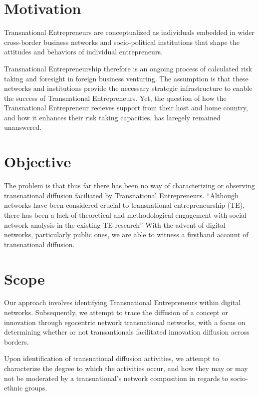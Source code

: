 \section{Motivation}
Transnational Entrepreneurs are conceptualized as individuals embedded
in wider cross-border business networks and socio-political
institutions that shape the attitudes and behaviors of individual
entrepreneurs.

Transnational Entrepreneurship therefore is an ongoing process of
calculated risk taking and foresight in foreign business
venturing. The assumption is that these networks and institutions
provide the necessary strategic infrastructure to enable the success
of Transnational Entrepreneurs. Yet, the question of how the
Transnational Entrepreneur recieves support from their host and home
country, and how it enhances their risk taking capacities, has
laregely remained unanswered.

\section{Objective}
The problem is that thus far there has been no way of characterizing
or observing transnational diffusion faciliated by Transnational
Entrepreneurs. ``Although networks have been considered crucial to
transnational entrepreneurship (TE), there has been a lack of
theoretical and methodological engagement with social network analysis
in the existing TE research''\cite{Chen.2009} With the advent of
digital networks, particularly public ones, we are able to witness a
firsthand account of transnational diffusion.

\section{Scope}
Our approach involves identifying Transnational Entrepreneurs within
digital networks. Subsequently, we attempt to trace the diffusion of a
concept or innovation through egocentric network transnational
networks, with a focus on determining whether or not transantionals
facilitated innovation diffusion across borders.

Upon identification of transnational diffusion activities, we attempt
to characterize the degree to which the activities occur, and how they
may or may not be moderated by a transnational's network composition
in regards to socio-ethnic groups.
